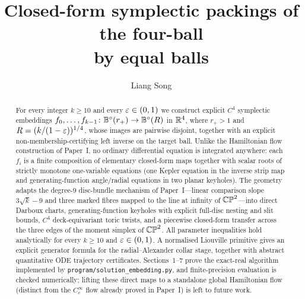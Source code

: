 \documentclass[11pt]{amsart}
\title[Closed-form symplectic packings of the four-ball]{Closed-form symplectic packings of the four-ball\\ by equal balls}
\author{Liang Song}
\date{}
\begin{document}
\begin{abstract}
For every integer $k\ge10$ and every $\varepsilon\in(0,1)$ we construct explicit $C^4$ symplectic embeddings
$f_0,\dots,f_{k-1}\colon\mathbb{B}^{\circ}(r_+)\to\mathbb{B}^{\circ}(R)$ in $\mathbb{R}^4$, where $r_+>1$ and $R=(k/(1-\varepsilon))^{1/4}$, whose
images are pairwise disjoint, together with an explicit non-membership-certifying left inverse on the target ball.
Unlike the Hamiltonian flow construction of Paper~I, no ordinary differential equation is integrated anywhere: each
$f_i$ is a finite composition of elementary closed-form maps together with scalar roots of strictly monotone
one-variable equations (one Kepler equation in the inverse strip map and generating-function angle/radial equations in
two planar keyholes). The geometry adapts the degree-$9$ disc-bundle mechanism of Paper~I---linear comparison slope
$3\sqrt k-9$ and three marked fibres mapped to the line at infinity of $\mathbb{CP}^2$---into direct Darboux charts,
generating-function keyholes with explicit full-disc nesting and slit bounds, $C^4$ deck-equivariant toric twists, and a
piecewise closed-form transfer across the three edges of the moment simplex of $\mathbb{CP}^2$. All parameter inequalities hold
analytically for every $k\ge10$ and $\varepsilon\in(0,1)$. A normalised Liouville primitive gives an explicit generator
formula for the radial--Alexander collar stage, together with abstract quantitative ODE trajectory certificates.
Sections~1--7 prove the exact-real algorithm implemented by \texttt{program/solution\_embedding.py}, and finite-precision
evaluation is checked numerically; lifting these direct maps to a standalone global Hamiltonian flow (distinct from the
$C^\infty_c$ flow already proved in Paper~I) is left to future work.
\end{abstract}
\maketitle







\end{document}
